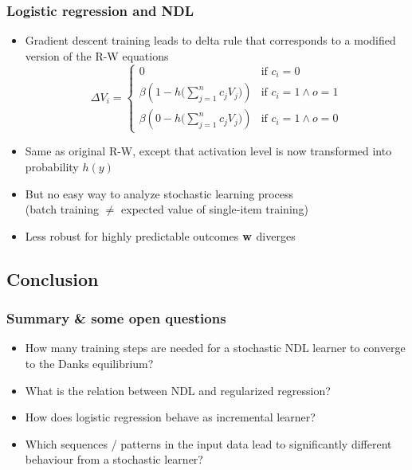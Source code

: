 \documentclass[t]{beamer} %
\begin{document}
\begin{frame}
  \frametitle{Logistic regression and NDL}

  \begin{itemize}
  \item Gradient descent training leads to delta rule that corresponds to a modified version of the R-W equations
    \[
    \Delta V_i =
    \begin{cases}
      0 & \text{if } c_i = 0\\
      \beta \left( 1 - h \bigl( \sum_{j=1}^n c_j V_j \bigr) \right) & \text{if } c_i = 1 \wedge o = 1 \\
      \beta \left( 0 - h \bigl( \sum_{j=1}^n c_j V_j \bigr) \right) & \text{if } c_i = 1 \wedge o = 0
    \end{cases}
    \]
  \item<2-> Same as original R-W, except that activation level is now transformed into probability $h(y)$
  \item<2-> But no easy way to analyze stochastic learning process\\
    (batch training $\neq$ expected value of single-item training)
  \item<2-> Less robust for highly predictable outcomes \so $\vw$ diverges
  \end{itemize}
\end{frame}


\subsection{Conclusion}

\begin{frame}
  \frametitle{Summary \& some open questions}
  \begin{center}
    \setlength{\fboxrule}{1pt}
  \end{center}

  \gap[1]
  \begin{itemize}
  \item How many training steps are needed for a stochastic NDL learner to
    converge to the Danks equilibrium?
  \item What is the relation between NDL and regularized regression?
  \item How does logistic regression behave as incremental learner?
  \item Which sequences / patterns in the input data lead to significantly
    different behaviour from a stochastic learner?
  \end{itemize}

\end{frame}
\end{document}
